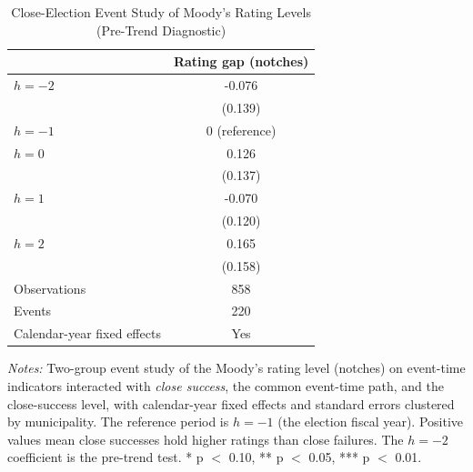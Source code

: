 \begin{table}[!htbp]
\centering
\caption{Close-Election Event Study of Moody's Rating Levels (Pre-Trend Diagnostic)}
\label{tab:post_northeast_rdd_event_study}
\small
\begin{tabular}{lc}
\toprule
 & Rating gap (notches) \\
\midrule
$h=-2$ & -0.076 \\
 & (0.139) \\
$h=-1$ & 0 (reference) \\
$h=0$ & 0.126 \\
 & (0.137) \\
$h=1$ & -0.070 \\
 & (0.120) \\
$h=2$ & 0.165 \\
 & (0.158) \\
\midrule
Observations & 858 \\
Events & 220 \\
Calendar-year fixed effects & Yes \\
\bottomrule
\end{tabular}
\vspace{0.05in}
\begin{minipage}{0.96\textwidth}\footnotesize\emph{Notes:} Two-group event study of the Moody's rating level (notches) on event-time indicators interacted with \emph{close success}, the common event-time path, and the close-success level, with calendar-year fixed effects and standard errors clustered by municipality. The reference period is $h=-1$ (the election fiscal year). Positive values mean close successes hold higher ratings than close failures. The $h=-2$ coefficient is the pre-trend test. * p $<$ 0.10, ** p $<$ 0.05, *** p $<$ 0.01.\end{minipage}
\end{table}

